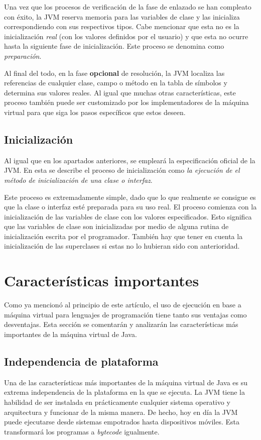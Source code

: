 \documentclass[english,runningheads,a4paper]{llncs}[2018/03/10]
\begin{document}
Una vez que los procesos de verificación de la fase de enlazado se han compleato
con éxito, la JVM reserva memoria para las variables de clase y las inicializa
correspondiendo con sus respectivos tipos. Cabe mencionar que esta no es la
inicialización \textit{real} (con los valores definidos por el usuario) y que
esta no ocurre hasta la siguiente fase de inicialización. Este proceso se
denomina como \textit{preparación}.

Al final del todo, en la fase \textbf{opcional} de resolución, la JVM localiza
las referencias de cualquier clase, campo o método en la tabla de símbolos y
determina sus valores reales. Al igual que muchas otras características, este
proceso también puede ser customizado por los implementadores de la máquina
virtual para que siga los pasos específicos que estos deseen.

\subsection*{Inicialización}
Al igual que en los apartados anteriores, se empleará la especificación oficial
de la JVM. En esta se describe el proceso de inicialización como \textit{la
ejecución de el método de inicialización de una clase o interfaz}.

Este proceso es extremadamente simple, dado que lo que realmente se consigue es
que la clase o interfaz esté preparada para su uso real. El proceso comienza con
la inicialización de las variables de clase con los valores especificados. Esto
significa que las variables de clase son inicializadas por medio de alguna
rutina de inicialización escrita por el programador. También hay que tener en
cuenta la inicialización de las superclases si estas no lo hubieran sido con
anterioridad. 

\section*{Características importantes}
Como ya mencionó al principio de este artículo, el uso de ejecución en base a
máquina virtual para lenguajes de programación tiene tanto sus ventajas como
desventajas. Esta sección se comentarán y analizarán las características más
importantes de la máquina virtual de Java.

\subsection*{Independencia de plataforma}
Una de las características más importantes de la máquina virtual de Java es su
extrema independencia de la plataforma en la que se ejecuta. La JVM tiene la
habilidad de ser instalada en prácticamente cualquier sistema operativo y
arquitectura y funcionar de la misma manera. De hecho, hoy en día la JVM puede
ejecutarse desde sistemas empotrados hasta dispositivos móviles. Esta
transformará los programas a \textit{bytecode} igualmente.
\end{document}
